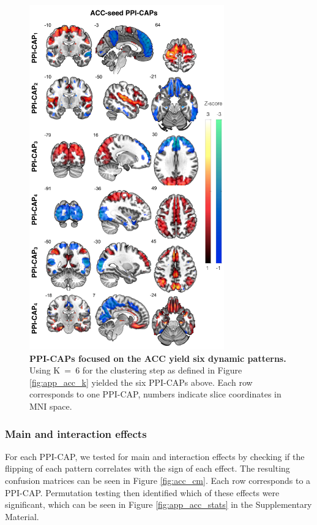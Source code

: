 \begin{figure}[h!]
\centering
\includegraphics[width=0.75\textwidth]{images/Ch5/Ch5_ACC_PPI-CAPs.png}
\caption{\textbf{PPI-CAPs focused on the ACC yield six dynamic patterns.} Using K~=~6 for the clustering step as defined in Figure \ref{fig:app_acc_k} yielded the six PPI-CAPs above. Each row corresponds to one PPI-CAP, numbers indicate slice coordinates in MNI space.}
\label{fig:acc_ppicaps}
\end{figure}



\subsubsection{Main and interaction effects}
For each PPI-CAP, we tested for main and interaction effects by checking if the flipping of each pattern correlates with the sign of each effect. The resulting confusion matrices can be seen in Figure \ref{fig:acc_cm}. Each row corresponds to a PPI-CAP. Permutation testing then identified which of these effects were significant, which can be seen in Figure \ref{fig:app_acc_stats} in the Supplementary Material.



